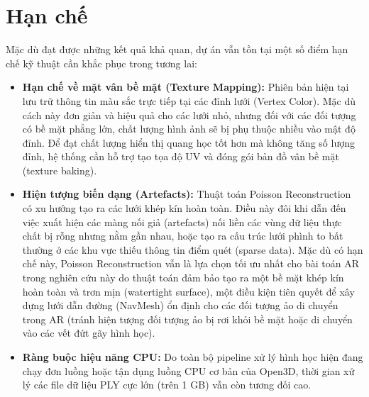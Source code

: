 \documentclass[a4paper,12pt]{report}
\begin{document}
\section{Hạn chế}
Mặc dù đạt được những kết quả khả quan, dự án vẫn tồn tại một số điểm hạn chế kỹ thuật cần khắc phục trong tương lai:
\begin{itemize}
    \item \textbf{Hạn chế về mặt vân bề mặt (Texture Mapping):} Phiên bản hiện tại lưu trữ thông tin màu sắc trực tiếp tại các đỉnh lưới (Vertex Color). Mặc dù cách này đơn giản và hiệu quả cho các lưới nhỏ, nhưng đối với các đối tượng có bề mặt phẳng lớn, chất lượng hình ảnh sẽ bị phụ thuộc nhiều vào mật độ đỉnh. Để đạt chất lượng hiển thị quang học tốt hơn mà không tăng số lượng đỉnh, hệ thống cần hỗ trợ tạo tọa độ UV và đóng gói bản đồ vân bề mặt (texture baking).
    \item \textbf{Hiện tượng biến dạng (Artefacts):} Thuật toán Poisson Reconstruction có xu hướng tạo ra các lưới khép kín hoàn toàn. Điều này đôi khi dẫn đến việc xuất hiện các màng nối giả (artefacts) nối liền các vùng dữ liệu thực chất bị rỗng nhưng nằm gần nhau, hoặc tạo ra cấu trúc lưới phình to bất thường ở các khu vực thiếu thông tin điểm quét (sparse data). Mặc dù có hạn chế này, Poisson Reconstruction vẫn là lựa chọn tối ưu nhất cho bài toán AR trong nghiên cứu này do thuật toán đảm bảo tạo ra một bề mặt khép kín hoàn toàn và trơn mịn (watertight surface), một điều kiện tiên quyết để xây dựng lưới dẫn đường (NavMesh) ổn định cho các đối tượng ảo di chuyển trong AR (tránh hiện tượng đối tượng ảo bị rơi khỏi bề mặt hoặc di chuyển vào các vết đứt gãy hình học).
    \item \textbf{Ràng buộc hiệu năng CPU:} Do toàn bộ pipeline xử lý hình học hiện đang chạy đơn luồng hoặc tận dụng luồng CPU cơ bản của Open3D, thời gian xử lý các file dữ liệu PLY cực lớn (trên 1 GB) vẫn còn tương đối cao.
\end{itemize}
\end{document}
